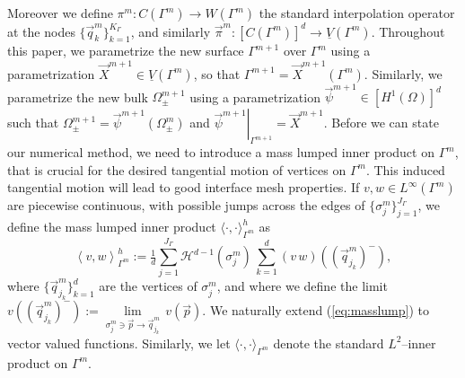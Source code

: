 \documentclass[a4paper,12pt,onecolumn]{article}
\newcommand{\Vh}{\underline{V}(\Gamma^m)}
\newcommand{\Wh}{W(\Gamma^m)}
\begin{document}
Moreover we define $\pi^m: C(\Gamma^m)\to \Wh$ the standard interpolation
operator at the nodes $\{\vec{q}_k^m\}_{k=1}^{K_\Gamma}$, and similarly
$\vec\pi^m: [C(\Gamma^m)]^d\to \Vh$. Throughout this paper, we parametrize
the new surface $\Gamma^{m+1}$ over $\Gamma^m$ using a parametrization
$\vec{X}^{m+1} \in \Vh$, so that $\Gamma^{m+1} = \vec{X}^{m+1}(\Gamma^m)$.
Similarly, we parametrize the new bulk $\Omega^{m+1}_\pm$ using a
parametrization $\vec{\psi}^{m+1} \in [H^1(\Omega)]^d$ such that
$\Omega^{m+1}_\pm = \vec{\psi}^{m+1}(\Omega^m_\pm)$ and
$\left.\vec{\psi}^{m+1}\right|_{\Gamma^{m+1}}=\vec X^{m+1}$.
Before we can state our numerical method, we need to introduce a mass lumped
inner product on $\Gamma^m$, that is crucial for the desired tangential motion
of vertices on $\Gamma^m$. This induced tangential motion
will lead to good interface mesh properties.
If $v,w \in L^\infty(\Gamma^m)$ are piecewise continuous, with possible jumps
across the edges of $\{\sigma_j^m\}_{j=1}^{J_\Gamma}$, we define the mass
lumped inner product $\langle\cdot,\cdot\rangle_{\Gamma^m}^h$ as
\begin{equation} \label{eq:masslump}
\left\langle v, w \right\rangle^h_{\Gamma^m} :=
\tfrac1d \sum_{j=1}^{J_\Gamma} \mathcal{H}^{d-1}(\sigma^m_j)\,
\sum_{k=1}^{d} (v\,w)((\vec{q}^m_{j_k})^-),
\end{equation}
where $\{\vec{q}^m_{j_k}\}_{k=1}^{d}$ are the vertices of $\sigma^m_j$, and
where we define the limit $v((\vec{q}^m_{j_k})^-)
:= \underset{\sigma^m_j\ni \vec{p}\to \vec{q}^m_{j_k}}{\lim}\, v(\vec{p})$. We
naturally extend (\ref{eq:masslump}) to vector valued functions. Similarly, we
let $\langle\cdot,\cdot\rangle_{\Gamma^m}$ denote the standard $L^2$--inner
product on $\Gamma^m$.
\end{document}
